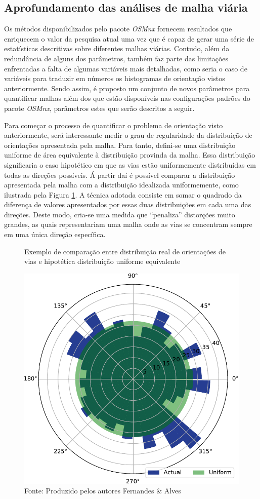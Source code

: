 \subsection{Aprofundamento das análises de malha viária} \label{sec:aprofund-LMR}

Os métodos disponibilizados pelo pacote \textit{OSMnx} fornecem resultados que enriquecem o valor da pesquisa atual uma vez que é capaz de gerar uma série de estatísticas descritivas sobre diferentes malhas viárias.
Contudo, além da redundância de alguns dos parâmetros, também faz parte das limitações enfrentadas a falta de algumas variáveis mais detalhadas, como seria o caso de variáveis para traduzir em números os histogramas de orientação vistos anteriormente.
Sendo assim, é proposto um conjunto de novos parâmetros para quantificar malhas além dos que estão disponíveis nas configurações padrões do pacote \textit{OSMnx}, parâmetros estes que serão descritos a seguir.

Para começar o processo de quantificar o problema de orientação visto anteriormente, será interessante medir o grau de regularidade da distribuição de orientações apresentada pela malha.
Para tanto, defini-se uma distribuição uniforme de área equivalente à distribuição provinda da malha. 
Essa distribuição significaria o caso hipotético em que as vias estão uniformemente distribuídas em todas as direções possíveis.
Á partir daí é possível comparar a distribuição apresentada pela malha com a distribuição idealizada uniformemente, como ilustrada pela Figura \ref{fig:uniform_histogram}. 
%
A técnica adotada consiste em somar o quadrado da diferença de valores apresentados por essas duas distribuições em cada uma das direções.
Deste modo, cria-se uma medida que ``penaliza'' distorções muito grandes, as quais representariam uma malha onde as vias se concentram sempre em uma única direção específica.

\begin{figure}[htbp]
    \centering
    \caption{Exemplo de comparação entre distribuição real de orientações de vias e hipotética distribuição uniforme equivalente}
    \includegraphics[height=0.45\textwidth]{images/4_materiais/lmr_analyzer/histogram_uniform.pdf}
    \caption*{Fonte: Produzido pelos autores Fernandes \& Alves}
    \label{fig:uniform_histogram}
\end{figure}

